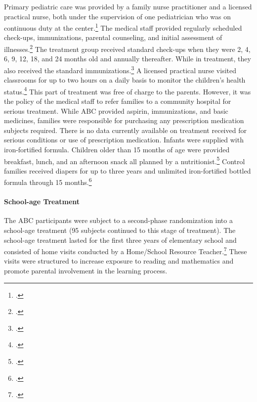 \begin{appendices}
\noindent Primary pediatric care was provided by a family nurse practitioner and a licensed practical nurse, both under the supervision of one pediatrician who was on continuous duty at the center.\footnote{\citet{Haskins-et-al_1978_JoPP}.} The medical staff provided regularly scheduled check-ups, immunizations, parental counseling, and initial assessment of illnesses.\footnote{\citet{Ramey-et-al_1977_Intro-to-ABC}.} The treatment group received standard check-ups when they were 2, 4, 6, 9, 12, 18, and 24 months old and annually thereafter. While in treatment, they also received the standard immunizations.\footnote{\citet{Campbell_Conti_etal_2014_EarlyChildhoodInvestments}.} A licensed practical nurse visited classrooms for up to two hours on a daily basis to monitor the children's health status.\footnote{\citet{Sanyal_Henderson_etal_1980_JoPediatrics}.} This part of treatment was free of charge to the parents. However, it was the policy of the medical staff to refer families to a community hospital for serious treatment. While ABC provided aspirin, immunizations, and basic medicines, families were responsible for purchasing any prescription medication subjects required. There is no data currently available on treatment received for serious conditions or use of prescription medication.  Infants were supplied with iron-fortified formula. Children older than 15 months of age were provided breakfast, lunch, and an
afternoon snack all planned by a nutritionist.\footnote{\citet{Campbell_Conti_etal_2014_EarlyChildhoodInvestments,abc2014-2015interviews}.} Control families received diapers for up to three years and unlimited iron-fortified bottled formula through 15 months.\footnote{\citet{Ramey_Collier_etal_1976_CarolinaAbecedarianProject,Ramey_Campbell_1979_SR}.}

\paragraph{School-age Treatment}

\noindent The ABC participants were subject to a second-phase randomization into a school-age treatment (95 subjects continued to this stage of treatment). The school-age treatment lasted for the first three years of elementary school and consisted of home visits conducted by a Home/School Resource Teacher.\footnote{\cite{Burchinal_Campbell_etal_1997_CD}.} These visits were structured to increase exposure to reading and mathematics and promote parental involvement in the learning process.\\


\end{appendices}
